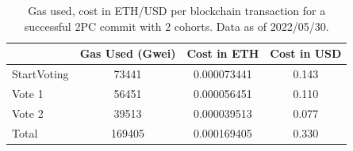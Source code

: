 \documentclass[11pt,conference]{IEEEtran}
\begin{document}
\appendix
\label{appendix}
\begin{table}[hbtp]
  \centering
  \caption{Gas used, cost in ETH/USD per blockchain transaction for a successful 2PC commit with 2 cohorts. Data as of 2022/05/30.}
  \label{table:cost}
  \begin{tabular}{|l|c|c|c|}
    \hline
          & Gas Used (Gwei) &  Cost in ETH & Cost in USD \\
          \hline
    StartVoting &73441 &0.000073441 & 0.143\\
    \hline
    Vote 1 &56451	&0.000056451 &0.110\\
    \hline
    Vote 2 &39513 &0.000039513 &0.077\\
    \hline
    Total &169405 &0.000169405 &0.330\\
    \hline
  \end{tabular}
\end{table}
\end{document}
